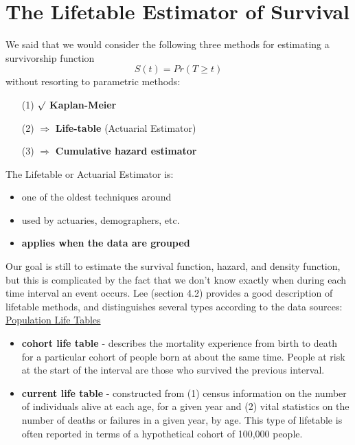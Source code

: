 \documentclass[11pt,slidesonly,semrot,portrait,palatino]{book}
\begin{document}
\section{The Lifetable Estimator of Survival}
We said that we would consider the following
three methods for estimating a survivorship
function
$$S(t) = Pr(T \ge t)$$
without resorting to parametric methods:

\begin{itemize}
\item[(1)] $\surd$ {\bf Kaplan-Meier}\\[1ex]
\item[(2)] $\Longrightarrow$ {\bf Life-table} (Actuarial Estimator)\\[1ex]
\item[(3)] $\Longrightarrow$ {\bf Cumulative hazard estimator}\\
\end{itemize}
The Lifetable or Actuarial Estimator is:
\begin{itemize}
\item one of the oldest techniques around\\
\item used by actuaries, demographers, etc. \\
\item {\bf applies when the data are grouped}
\end{itemize}
Our goal is still to estimate the survival function, hazard, and
density function, but this is complicated by the fact that we
don't know exactly when during each time interval an event occurs.
Lee (section 4.2) provides a good description of lifetable methods,
and distinguishes several types according to the data sources:
\\[2ex]
\underline{\sc Population Life Tables}
\begin{itemize}
\item  {\bf cohort life table} - describes the mortality experience from
    birth to death for a particular
     cohort of people born at about the same time. People at risk at the
start of the interval are those who survived the previous interval.
\item  {\bf current life table} - constructed from (1) census information
on the number of individuals alive  at each age, for a given year and
(2) vital statistics on the number of deaths or failures in a given
        year, by age.   This type of lifetable is often reported in terms
        of a hypothetical cohort of 100,000 people.
\end{itemize}
\end{document}
